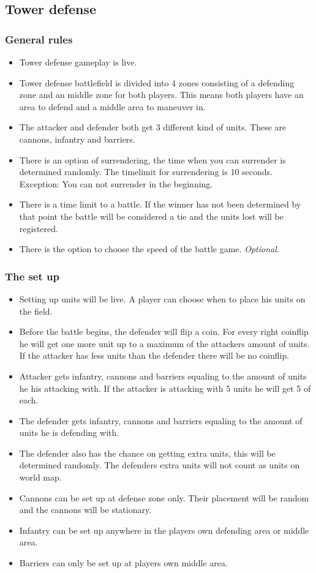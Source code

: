 \documentclass[12pt,a4paper]{article}
\begin{document}
\subsection{Tower defense}

\subsubsection{General rules}
\begin{itemize}
\item Tower defense gameplay is live.
\item Tower defense battlefield is divided into 4 zones consisting of
  a defending zone and an middle zone for both players. This means
  both players have an area to defend and a middle area to maneuver
  in.
\item The attacker and defender both get 3 different kind of
  units. These are cannons, infantry and barriers.
\item There is an option of surrendering, the time when you can
  surrender is determined randomly. The timelimit for surrendering is
  10 seconds. Exception: You can not surrender in the beginning.
\item There is a time limit to a battle. If the winner has not been
  determined by that point the battle will be considered a tie and the
  units lost will be registered.
\item There is the option to choose the speed of the battle
  game. \emph{Optional}.
\end{itemize}

\subsubsection{The set up}
\begin{itemize}
\item Setting up units will be live. A player can choose when to place
  his units on the field.
\item Before the battle begins, the defender will flip a coin. For
  every right coinflip he will get one more unit up to a maximum of
  the attackers amount of units. If the attacker has less units than
  the defender there will be no coinflip.
\item Attacker gets infantry, cannons and barriers equaling to the
  amount of units he his attacking with. If the attacker is attacking
  with 5 units he will get 5 of each.
\item The defender gets infantry, cannons and barriers equaling to the
  amount of units he is defending with.
\item The defender also has the chance on getting extra units, this
  will be determined randomly. The defenders extra units will not
  count as units on world map.
\item Cannons can be set up at defense zone only. Their placement will
  be random and the cannons will be stationary.
\item Infantry can be set up anywhere in the players own defending
  area or middle area.
\item Barriers can only be set up at players own middle area.
\end{itemize}
\end{document}
